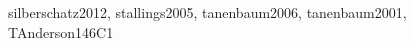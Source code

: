 \begin{syllabus}
\begin{unit}{\OSOperatingSystemPrinciples}{}{silberschatz2012, stallings2005, tanenbaum2006, tanenbaum2001, TAnderson14}{6}{C1}
\begin{topics}
      \item \OSOperatingSystemPrinciplesTopicStructuring
      \item \OSOperatingSystemPrinciplesTopicAbstractions
      \item \OSOperatingSystemPrinciplesTopicConcepts
      \item \OSOperatingSystemPrinciplesTopicThe
      \item \OSOperatingSystemPrinciplesTopicDevice
      \item \OSOperatingSystemPrinciplesTopicInterrupts
      \item \OSOperatingSystemPrinciplesTopicConcept
\end{topics}
\begin{learningoutcomes}
	\item \OSOperatingSystemPrinciplesLOExplainTheA [\Familiarity]
	\item \OSOperatingSystemPrinciplesLOExplainTheBuilding [\Familiarity]
	\item \OSOperatingSystemPrinciplesLODescribeTheApis [\Familiarity]
	\item \OSOperatingSystemPrinciplesLODescribeHowAreApplication [\Familiarity]
	\item \OSOperatingSystemPrinciplesLOContrastKernel [\Assessment]
	\item \OSOperatingSystemPrinciplesLODiscussTheDisadvantagesInterrupt [\Familiarity]
	\item \OSOperatingSystemPrinciplesLOExplainTheAAnd [\Familiarity]
\end{learningoutcomes}
\end{unit}


\end{syllabus}
